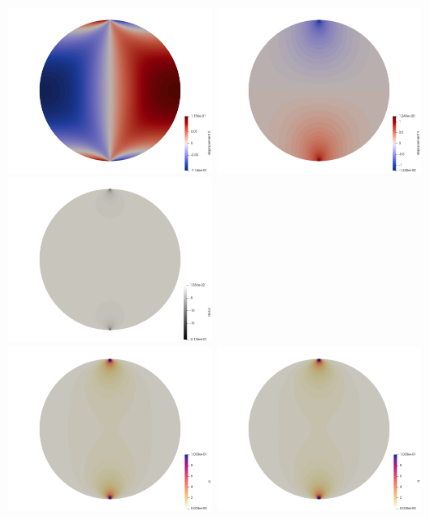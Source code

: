 \newpage
\begin{center}
\includegraphics[width=5.4cm]{python_codes/fieldstone_58/experiment1/111/u}
\includegraphics[width=5.4cm]{python_codes/fieldstone_58/experiment1/111/v}
\includegraphics[width=5.4cm]{python_codes/fieldstone_58/experiment1/111/divv}\\
\includegraphics[width=5.4cm]{python_codes/fieldstone_58/experiment1/111/p}
\includegraphics[width=5.4cm]{python_codes/fieldstone_58/experiment1/111/q}

\end{center}
